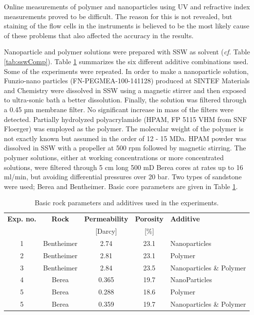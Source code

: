 Online measurements of polymer and nanoparticles using UV and refractive index measurements proved to be difficult. The reason for this is not revealed, but staining of the flow cells in the instruments is believed to be the most likely cause of these problems that also affected the accuracy in the results.

Nanoparticle and polymer solutions were prepared with  SSW as solvent (\textit{cf.} Table \ref{tab:sswComp}). Table \ref{tab:rockParams} summarizes the six different additive combinations used. Some of the experiments were repeated. In order to make a nanoparticle solution, Funzio-nano particles (FN-PEGMEA-100-141128) produced at SINTEF Materials and Chemistry were dissolved in SSW using a magnetic stirrer and then exposed to ultra-sonic bath a better dissolution. Finally, the solution was filtered through a 0.45 µm membrane filter. No significant increase in mass of the filters were detected. Partially hydrolyzed polyacrylamide (HPAM, FP 5115 VHM from SNF Floerger) was employed as the polymer. The molecular weight of the polymer is not exactly known but assumed in the order of 12 - 15 MDa. HPAM powder was dissolved in SSW with a propeller at 500 rpm followed by magnetic stirring. The polymer solutions, either at working concentrations or more concentrated solutions, were filtered through 5 cm long 500 mD Berea cores at rates up to 16 ml/min, but avoiding differential pressures over 20 bar. Two types of sandstone were used; Berea and Bentheimer. Basic core parameters are given in Table \ref{tab:rockParams}.

\begin{table} 
\small
\centering
\caption{Basic rock parameters and additives used in the experiments.}
\label{tab:rockParams}
\begin{tabular}{c c c c l } 
\toprule
\textbf{Exp. no.} & \textbf{Rock} & \textbf{Permeability} & \textbf{Porosity} & \textbf{Additive} \\ 
&& [Darcy] & [\%] & \\
\midrule 
1   & Bentheimer    & 2.74 & 23.1 & Nanoparticles\\
2   & Bentheimer    & 2.81 & 23.1 & Polymer \\ 
3   & Bentheimer    & 2.84 & 23.5 & Nanoparticles \& Polymer \\ 
4   & Berea      & 0.365 & 19.7 & NanoParticles\\
5   & Berea      & 0.288 & 18.6 & Polymer \\ 
5   & Berea      & 0.359 & 19.7 & Nanoparticles \& Polymer \\ 
\bottomrule
\end{tabular}
\end{table}




